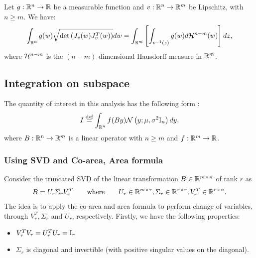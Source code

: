 \documentclass[a4paper,10pt]{article}
\begin{document}
\begin{theorem}
    \label{theorem:coarea}
    Let $g: \mathbb{R}^n \to \mathbb{R}$ be a measurable function and $v: \mathbb{R}^n \to \mathbb{R}^m$ be Lipschitz, with $n \geqslant m$. We have: 
    \begin{equation*}
        \int_{\mathbb{R}^n} g(w) \sqrt{\mathrm{det}\left( J_v(w) J_v^T(w) \right)} dw = \int_{\mathbb{R}^m} \left[ \int_{v^{-1}(z)} g(w) d\mathcal{H}^{n - m}(w) \right] dz,
    \end{equation*}
    where $\mathcal{H}^{n - m}$ is the $(n - m)$ dimensional Hausdorff measure in $\mathbb{R}^m$. 
\end{theorem}

\subsection{Integration on subspace}
The quantity of interest in this analysis has the following form :
\begin{equation*}
    I \overset{\text{\scriptsize{def}}}{=} \int_{\mathbb{R}^n} f(B y) \mathcal{N}\left( {y; \mu, \sigma^2 \mathrm{I}_n} \right) dy ,
\end{equation*}
where $B: \mathbb{R}^n \to \mathbb{R}^m$  is a linear operator with  $n \geqslant m$ and $f:\mathbb{R}^m \to \mathbb{R}$.
\subsubsection*{Using SVD and Co-area, Area formula}
Consider the truncated SVD of the linear transformation $B \in \mathbb{R}^{m \times n}$ of rank $r$ as 
\begin{equation*}
    B = U_r \Sigma_r V_r^T \qquad \mbox{where} \qquad U_r \in \mathbb{R}^{m \times r}, \Sigma_r \in \mathbb{R}^{r \times r}, V_r^T \in \mathbb{R}^{r \times n}.
\end{equation*}
The idea is to apply the co-area  and area formula  to perform change of variables, through $V_r^T, \Sigma_r$ and $U_r$, respectively.
Firstly, we have the following properties:
\begin{itemize}
    \item[] $V_r^T V_r = U_r^T U_r = \mathrm{I}_r$
    \item[] $\Sigma_r$ is diagonal and invertible (with positive singular values on the diagonal).
\end{itemize}
\end{document}
